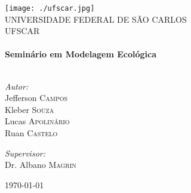 \begin{titlepage}

\begin{center}

\texttt{[image: ./ufscar.jpg]}\\[1cm]    

\textsc{\LARGE UNIVERSIDADE FEDERAL DE SÃO CARLOS}\\[1.5cm]

\textsc{\Large UFSCAR}\\[0.5cm]

\HRule \\[0.4cm]
{ \huge \bfseries Seminário em Modelagem Ecológica}\\[0.4cm]

\HRule \\[1.5cm]


\begin{minipage}{0.4\textwidth}
\begin{flushleft} \large
\emph{Autor:}\\
Jefferson \textsc{Campos}\\
Kleber \textsc{Souza}\\
Lucas \textsc{Apolinário}\\
Ruan \textsc{Castelo}
\end{flushleft}
\end{minipage}
\begin{minipage}{0.4\textwidth}
\begin{flushright} \large
\emph{Supervisor:} \\
Dr. Albano \textsc{Magrin}
\end{flushright}
\end{minipage}

\vfill

{\large \today}

\end{center}

\end{titlepage}
